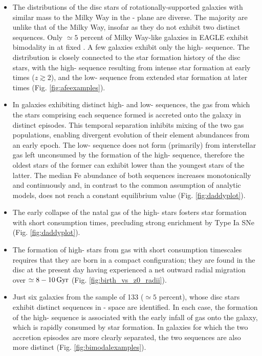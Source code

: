 \begin{itemize}
\item The distributions of the disc stars of rotationally-supported galaxies with similar mass to the Milky Way in the \afe{}-\feh{} plane are diverse. The majority are unlike that of the Milky Way, insofar as they do not exhibit two distinct sequences. Only $\simeq 5$ percent of Milky Way-like galaxies in EAGLE exhibit bimodality in \afe{} at fixed \feh{}. A few galaxies exhibit only the high-\afe{} sequence. The distribution is closely connected to the star formation history of the disc stars, with the high-\afe{} sequence resulting from intense star formation at early times ($z \gtrsim 2$), and the low-\afe{} sequence from extended star formation  at later times (Fig. \ref{fig:afeexamples}).

\item In galaxies exhibiting distinct high- and low-\afe{} sequences, the gas from which the stars comprising each sequence formed is accreted onto the galaxy in distinct episodes. This temporal separation inhibits mixing of the two gas populations, enabling divergent evolution of their element abundances from an early epoch. The low-\afe{} sequence does not form (primarily) from interstellar gas left unconsumed by the formation of the high-\afe{} sequence, therefore the oldest stars of the former can exhibit lower \feh{} than the youngest stars of the latter. The median Fe abundance of both sequences increases monotonically and continuously and, in contrast to the common assumption of analytic models, does not reach a constant equilibrium value (Fig. \ref{fig:daddyplot}).

\item The early collapse of the natal gas of the high-\afe{} stars fosters star formation with short consumption times, precluding strong enrichment by Type Ia SNe (Fig. \ref{fig:daddyplot}).

\item The formation of high-\afe{} stars from gas with short consumption timescales requires that they are born in a compact configuration; they are found in the disc at the present day having experienced a net outward radial migration over $\simeq 8-10\,{\rm Gyr}$ (Fig. \ref{fig:birth_vs_z0_radii}).

\item Just six galaxies from the sample of 133 ($\simeq 5$ percent), whose disc stars exhibit distinct sequences in \afe{}-\feh{} space are identified. In each case, the formation of the high-\afe{} sequence is associated with the early infall of gas onto the galaxy, which is rapidly consumed by star formation. In galaxies for which the two accretion episodes are more clearly separated, the two sequences are also more distinct (Fig. \ref{fig:bimodalexamples}).


\end{itemize}
